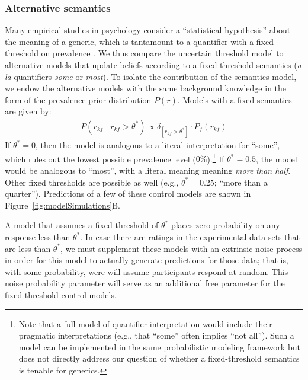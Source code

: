 \documentclass[floatsintext,doc]{apa6}
\let\rmarkdownfootnote\footnote%
\def\footnote{\protect\rmarkdownfootnote}
\begin{document}
\subsubsection{Alternative semantics}

Many empirical studies in psychology consider a ``statistical hypothesis'' about the meaning of a generic, which is tantamount to a quantifier with a fixed threshold on prevalence \cite{Prasada2006, Leslie2008, Cimpian2010, Khemlani2012, Prasada2013, Brandone2014}.
We thus compare the uncertain threshold model to alternative models that update beliefs according to a fixed-threshold semantics (\emph{a la} quantifiers \emph{some} or \emph{most}). 
To isolate the contribution of the semantics model,  we endow the alternative models with the same background knowledge in the form of the prevalence prior distribution \(P(r)\).
Models with a fixed semantics are given by:
\begin{eqnarray}
P (r_{kf} \mid r_{kf} >  \theta^*) \propto \delta_{[r_{kf} > \theta^*]} \cdot P_f(r_{kf})  \label{eq:L0fixed}
\end{eqnarray}
If $\theta^* = 0$, then the model is analogous to a literal interpretation for \enquote{some}, which rules out the lowest possible prevalence level ($0\%$).\footnote{Note that a full model of quantifier interpretation would include their pragmatic interpretations (e.g., that \enquote{some} often implies \enquote{not all}). Such a model can be implemented in the same probabilistic modeling framework \cite{Goodman2013} but does not directly address our question of whether a fixed-threshold semantics is tenable for generics.} 
If $\theta^* = 0.5$, the model would be analogous to \enquote{most}, with a literal meaning meaning \emph{more than half}. 
Other fixed thresholds are possible as well (e.g., $\theta^* = 0.25$; \enquote{more than a quarter}).
Predictions of a few of these control models are shown in Figure~\ref{fig:modelSimulations}B.

A model that assumes a fixed threshold of $\theta^*$ places zero probability on any response less than $\theta^*$.
In case there are ratings in the experimental data sets that are less than $\theta^*$, we must supplement these models with an extrinsic noise process in order for this model to actually generate predictions for those data; that is, with some probability, were will assume participants respond at random.
This noise probability parameter will serve as an additional free parameter for the fixed-threshold control models. 
\end{document}

